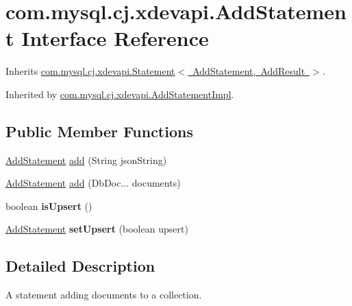 \hypertarget{interfacecom_1_1mysql_1_1cj_1_1xdevapi_1_1_add_statement}{}\section{com.\+mysql.\+cj.\+xdevapi.\+Add\+Statement Interface Reference}
\label{interfacecom_1_1mysql_1_1cj_1_1xdevapi_1_1_add_statement}


Inherits \mbox{\hyperlink{interfacecom_1_1mysql_1_1cj_1_1xdevapi_1_1_statement}{com.\+mysql.\+cj.\+xdevapi.\+Statement$<$ Add\+Statement, Add\+Result $>$}}.



Inherited by \mbox{\hyperlink{classcom_1_1mysql_1_1cj_1_1xdevapi_1_1_add_statement_impl}{com.\+mysql.\+cj.\+xdevapi.\+Add\+Statement\+Impl}}.

\subsection*{Public Member Functions}
\begin{DoxyCompactItemize}
\item 
\mbox{\hyperlink{interfacecom_1_1mysql_1_1cj_1_1xdevapi_1_1_add_statement}{Add\+Statement}} \mbox{\hyperlink{interfacecom_1_1mysql_1_1cj_1_1xdevapi_1_1_add_statement_a74f363f3bc32c51f83c4ae69722b179c}{add}} (String json\+String)
\item 
\mbox{\hyperlink{interfacecom_1_1mysql_1_1cj_1_1xdevapi_1_1_add_statement}{Add\+Statement}} \mbox{\hyperlink{interfacecom_1_1mysql_1_1cj_1_1xdevapi_1_1_add_statement_a886e1294099cf00085c882aba48bf06e}{add}} (Db\+Doc... documents)
\item 
\mbox{\label{interfacecom_1_1mysql_1_1cj_1_1xdevapi_1_1_add_statement_a22f74388f89be049d0f1c591e143874c}} 
boolean {\bfseries is\+Upsert} ()
\item 
\mbox{\label{interfacecom_1_1mysql_1_1cj_1_1xdevapi_1_1_add_statement_ab2681842a71332f6170cb5b227ff6ebd}} 
\mbox{\hyperlink{interfacecom_1_1mysql_1_1cj_1_1xdevapi_1_1_add_statement}{Add\+Statement}} {\bfseries set\+Upsert} (boolean upsert)
\end{DoxyCompactItemize}


\subsection{Detailed Description}
A statement adding documents to a collection. 

